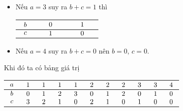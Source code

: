 \begin{vd}
{\begin{enumerate}
\begin{itemize}
\begin{center}
\begin{tabular}{|c|c|c|c|}
		\hline
		${\hskip 0.2 cm}c{\hskip 0.2 cm}$&${\hskip 0.5 cm}2{\hskip 0.5 cm}$ & ${\hskip 0.5 cm}1{\hskip 0.5 cm}$ & ${\hskip 0.5 cm}0{\hskip 0.5 cm}$\\
		\hline
	\end{tabular}
\end{center}
\item Nếu $a = 3$ suy ra $b + c = 1$ thì  
\begin{center} \renewcommand{\arraystretch}{2}
	\begin{tabular}{|c|c|c|}
		\hline
		${\hskip 0.2 cm}b{\hskip 0.2 cm}$&${\hskip 0.5 cm}0{\hskip 0.5 cm}$ & ${\hskip 0.5 cm}1{\hskip 0.5 cm}$\\
		\hline
		${\hskip 0.2 cm}c{\hskip 0.2 cm}$&${\hskip 0.5 cm}1{\hskip 0.5 cm}$ & ${\hskip 0.5 cm}0{\hskip 0.5 cm}$\\
		\hline
	\end{tabular}
\end{center}
\item  Nếu $a = 4$ suy ra $b + c = 0$ nên $b = 0$, $c = 0$.
\end{itemize}
\end{enumerate}
Khi đó ta có bảng giá trị 
\begin{center} \renewcommand{\arraystretch}{2}
	\begin{tabular}{|c|c|c|c|c|c|c|c|c|c|c|}
		\hline
		${\hskip 0.1 cm}a{\hskip 0.1 cm}$&${\hskip 0.1 cm}1{\hskip 0.1 cm}$ & ${\hskip 0.1 cm}1{\hskip 0.1 cm}$ & ${\hskip 0.1 cm}1{\hskip 0.1 cm}$& ${\hskip 0.1 cm}1{\hskip 0.1 cm}$& ${\hskip 0.1 cm}2{\hskip 0.1 cm}$& ${\hskip 0.1 cm}2{\hskip 0.1 cm}$& ${\hskip 0.1 cm}2{\hskip 0.1 cm}$& ${\hskip 0.1 cm}3{\hskip 0.1 cm}$& ${\hskip 0.1 cm}3{\hskip 0.1 cm}$& ${\hskip 0.1 cm}4{\hskip 0.1 cm}$\\
		\hline
		${\hskip 0.1 cm}b{\hskip 0.1 cm}$&${\hskip 0.1 cm}0{\hskip 0.1 cm}$ & ${\hskip 0.1 cm}1{\hskip 0.1 cm}$ & ${\hskip 0.1 cm}2{\hskip 0.1 cm}$& ${\hskip 0.1 cm}3{\hskip 0.1 cm}$& ${\hskip 0.1 cm}0{\hskip 0.1 cm}$& ${\hskip 0.1 cm}1{\hskip 0.1 cm}$& ${\hskip 0.1 cm}2{\hskip 0.1 cm}$& ${\hskip 0.1 cm}0{\hskip 0.1 cm}$& ${\hskip 0.1 cm}1{\hskip 0.1 cm}$& ${\hskip 0.1 cm}0{\hskip 0.1 cm}$\\
		\hline
		${\hskip 0.1 cm}c{\hskip 0.1 cm}$&${\hskip 0.1 cm}3{\hskip 0.1 cm}$ & ${\hskip 0.1 cm}2{\hskip 0.1 cm}$ & ${\hskip 0.1 cm}1{\hskip 0.1 cm}$& ${\hskip 0.1 cm}0{\hskip 0.1 cm}$& ${\hskip 0.1 cm}2{\hskip 0.1 cm}$& ${\hskip 0.1 cm}1{\hskip 0.1 cm}$& ${\hskip 0.1 cm}0{\hskip 0.1 cm}$& ${\hskip 0.1 cm}1{\hskip 0.1 cm}$& ${\hskip 0.1 cm}0{\hskip 0.1 cm}$& ${\hskip 0.1 cm}0{\hskip 0.1 cm}$\\

\end{tabular}
\end{center}}
\end{vd}
